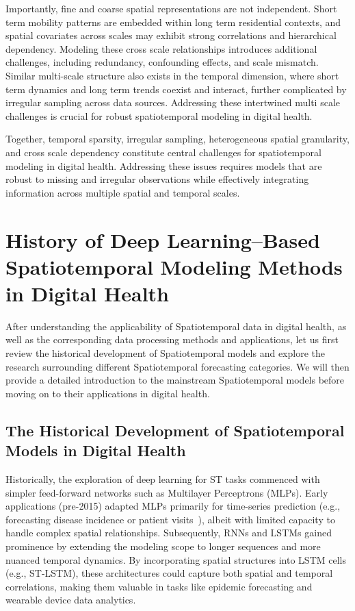 \documentclass[acmsmall]{acmart}
\begin{document}
Importantly, fine and coarse spatial representations are not independent. Short term mobility patterns are embedded within long term residential contexts, and spatial covariates across scales may exhibit strong correlations and hierarchical dependency. Modeling these cross scale relationships introduces additional challenges, including redundancy, confounding effects, and scale mismatch. Similar multi-scale structure also exists in the temporal dimension, where short term dynamics and long term trends coexist and interact, further complicated by irregular sampling across data sources. Addressing these intertwined multi scale challenges is crucial for robust spatiotemporal modeling in digital health.

Together, temporal sparsity, irregular sampling, heterogeneous spatial granularity, and cross scale dependency constitute central challenges for spatiotemporal modeling in digital health. Addressing these issues requires models that are robust to missing and irregular observations while effectively integrating information across multiple spatial and temporal scales.

\section{History of Deep Learning–Based Spatiotemporal Modeling Methods in Digital Health}
\label{sec:history}
After understanding the applicability of Spatiotemporal data in digital health, as well as the corresponding data processing methods and applications, let us first review the historical development of Spatiotemporal models and explore the research surrounding different Spatiotemporal forecasting categories. We will then provide a detailed introduction to the mainstream Spatiotemporal models before moving on to their applications in digital health.

\subsection{The Historical Development of Spatiotemporal Models in Digital Health}
Historically, the exploration of deep learning for ST tasks commenced with simpler feed-forward networks such as Multilayer Perceptrons (MLPs). Early applications (pre-2015) adapted MLPs primarily for time-series prediction (e.g., forecasting disease incidence or patient visits~\cite{miotto2018deeplearning}), albeit with limited capacity to handle complex spatial relationships. Subsequently, RNNs and LSTMs gained prominence by extending the modeling scope to longer sequences and more nuanced temporal dynamics. By incorporating spatial structures into LSTM cells (e.g., ST-LSTM), these architectures could capture both spatial and temporal correlations, making them valuable in tasks like epidemic forecasting and wearable device data analytics.
\end{document}
